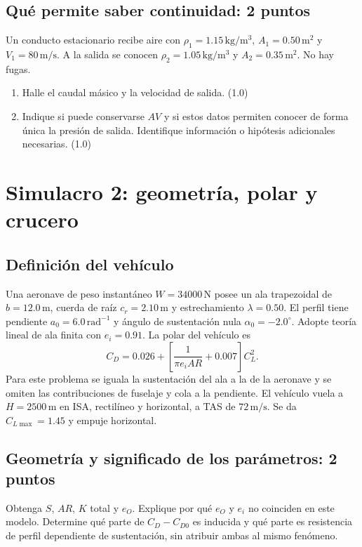 \section{Qué permite saber continuidad: 2 puntos}
Un conducto estacionario recibe aire con $\rho_1=1.15\,\mathrm{kg/m^3}$, $A_1=0.50\,\mathrm{m^2}$ y $V_1=80\,\mathrm{m/s}$. A la salida se conocen $\rho_2=1.05\,\mathrm{kg/m^3}$ y $A_2=0.35\,\mathrm{m^2}$. No hay fugas.
\begin{enumerate}[label=\alph*)]
\item Halle el caudal másico y la velocidad de salida. (1.0)
\item Indique si puede conservarse $AV$ y si estos datos permiten conocer de forma única la presión de salida. Identifique información o hipótesis adicionales necesarias. (1.0)
\end{enumerate}
\chapter{Simulacro 2: geometría, polar y crucero}
\section{Definición del vehículo}
Una aeronave de peso instantáneo $W=34000\,\mathrm N$ posee un ala trapezoidal de $b=12.0\,\mathrm m$, cuerda de raíz $c_r=2.10\,\mathrm m$ y estrechamiento $\lambda=0.50$. El perfil tiene pendiente $a_0=6.0\,\mathrm{rad^{-1}}$ y ángulo de sustentación nula $\alpha_0=-2.0^\circ$. Adopte teoría lineal de ala finita con $e_i=0.91$. La polar del vehículo es
\[
C_D=0.026+\left[\frac{1}{\pi e_iAR}+0.007\right]C_L^2.
\]
Para este problema se iguala la sustentación del ala a la de la aeronave y se omiten las contribuciones de fuselaje y cola a la pendiente. El vehículo vuela a $H=2500\,\mathrm m$ en ISA, rectilíneo y horizontal, a TAS de $72\,\mathrm{m/s}$. Se da $C_{L\max}=1.45$ y empuje horizontal.
\section{Geometría y significado de los parámetros: 2 puntos}
Obtenga $S$, $AR$, $K$ total y $e_O$. Explique por qué $e_O$ y $e_i$ no coinciden en este modelo. Determine qué parte de $C_D-C_{D0}$ es inducida y qué parte es resistencia de perfil dependiente de sustentación, sin atribuir ambas al mismo fenómeno.
